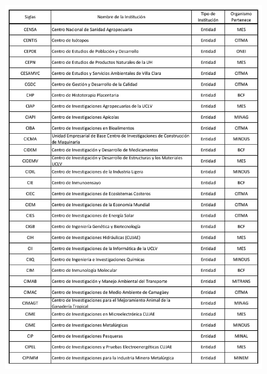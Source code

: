 \begin{figure}
    \centering
    \includegraphics[width=\linewidth]{Figure/anexo/2}\label{fig:figure2}
\end{figure}

